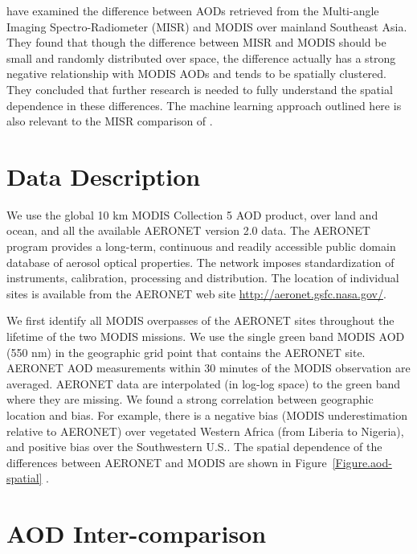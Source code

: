 \documentclass[journal]{IEEEtran}
\begin{document}
\cite{Xiao:2009} have examined the difference between AODs retrieved from the Multi-angle Imaging Spectro-Radiometer (MISR) and MODIS over mainland Southeast Asia. They found that though the difference between MISR and MODIS should be small and randomly distributed over space, the difference actually has a strong negative relationship with MODIS AODs and tends to be spatially clustered. They concluded that further research is needed to fully understand the spatial dependence in these differences. The machine learning approach outlined here is also relevant to the MISR comparison of \cite{Xiao:2009}. 

\section{Data Description}

We use the global 10 km MODIS Collection 5 AOD product, over land and ocean, and all the available AERONET version 2.0 data. The AERONET program provides a long-term, continuous and readily accessible public domain database of aerosol optical properties. The network imposes standardization of instruments, calibration, processing and distribution. The location of individual sites is available from the AERONET web site \url{http://aeronet.gsfc.nasa.gov/}. 

We first identify all MODIS overpasses of the AERONET sites throughout the lifetime of the two MODIS missions. We use the single green band MODIS AOD (550 nm) in the geographic grid point that contains the AERONET site. AERONET AOD measurements within 30 minutes of the MODIS observation are averaged. AERONET data are interpolated (in log-log space) to the green band where they are missing. We found a strong correlation between geographic location and bias.  For example, there is a negative bias (MODIS underestimation relative to AERONET) over vegetated Western Africa (from Liberia to Nigeria), and positive bias over the Southwestern U.S.. The spatial dependence of the differences between AERONET and MODIS are shown in Figure~\ref{Figure.aod-spatial} \cite{Paradise:2007}.

\section{AOD Inter-comparison}
\end{document}
